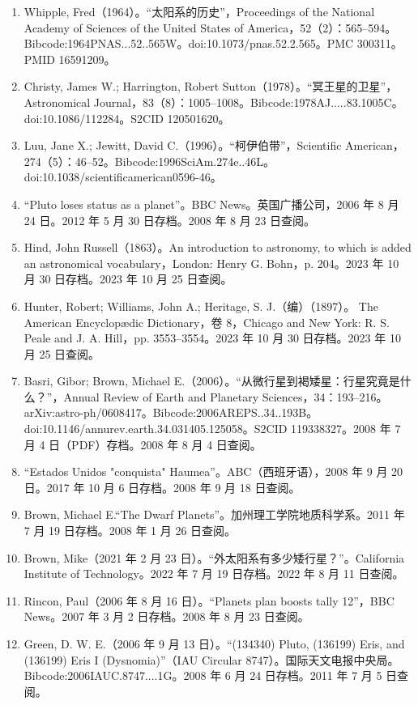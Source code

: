 \begin{enumerate}
\item Whipple, Fred（1964）。“太阳系的历史”，Proceedings of the National Academy of Sciences of the United States of America，52（2）：565–594。Bibcode:1964PNAS...52..565W。doi:10.1073/pnas.52.2.565。PMC 300311。PMID 16591209。
\item Christy, James W.; Harrington, Robert Sutton（1978）。“冥王星的卫星”，Astronomical Journal，83（8）：1005–1008。Bibcode:1978AJ.....83.1005C。doi:10.1086/112284。S2CID 120501620。
\item Luu, Jane X.; Jewitt, David C.（1996）。“柯伊伯带”，Scientific American，274（5）：46–52。Bibcode:1996SciAm.274e..46L。doi:10.1038/scientificamerican0596-46。
\item “Pluto loses status as a planet”。BBC News。英国广播公司，2006 年 8 月 24 日。2012 年 5 月 30 日存档。2008 年 8 月 23 日查阅。
\item Hind, John Russell（1863）。An introduction to astronomy, to which is added an astronomical vocabulary，London: Henry G. Bohn，p. 204。2023 年 10 月 30 日存档。2023 年 10 月 25 日查阅。
\item Hunter, Robert; Williams, John A.; Heritage, S. J.（编）（1897）。
The American Encyclopædic Dictionary，卷 8，Chicago and New York: R. S. Peale and J. A. Hill，pp. 3553–3554。2023 年 10 月 30 日存档。2023 年 10 月 25 日查阅。
\item Basri, Gibor; Brown, Michael E.（2006）。“从微行星到褐矮星：行星究竟是什么？”，Annual Review of Earth and Planetary Sciences，34：193–216。arXiv:astro-ph/0608417。Bibcode:2006AREPS..34..193B。doi:10.1146/annurev.earth.34.031405.125058。S2CID 119338327。2008 年 7 月 4 日（PDF）存档。2008 年 8 月 4 日查阅。
\item “Estados Unidos "conquista" Haumea”。ABC（西班牙语），2008 年 9 月 20 日。2017 年 10 月 6 日存档。2008 年 9 月 18 日查阅。
\item Brown, Michael E.“The Dwarf Planets”。加州理工学院地质科学系。2011 年 7 月 19 日存档。2008 年 1 月 26 日查阅。
\item Brown, Mike（2021 年 2 月 23 日）。“外太阳系有多少矮行星？”。California Institute of Technology。2022 年 7 月 19 日存档。2022 年 8 月 11 日查阅。
\item Rincon, Paul（2006 年 8 月 16 日）。“Planets plan boosts tally 12”，BBC News。2007 年 3 月 2 日存档。2008 年 8 月 23 日查阅。
\item Green, D. W. E.（2006 年 9 月 13 日）。“(134340) Pluto, (136199) Eris, and (136199) Eris I (Dysnomia)”（IAU Circular 8747）。国际天文电报中央局。Bibcode:2006IAUC.8747....1G。2008 年 6 月 24 日存档。2011 年 7 月 5 日查阅。

\end{enumerate}
